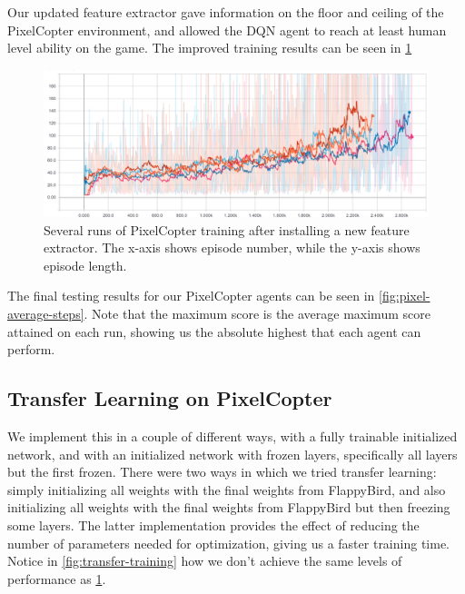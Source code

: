 \documentclass{article}
\begin{document}
Our updated feature extractor gave information on the floor and ceiling of the PixelCopter environment, and allowed the DQN agent to reach at least human level ability on the game. The improved training results can be seen in \ref{fig:pixelcopter-new-features}

\begin{figure}[h!]
\includegraphics[width=\textwidth]{pixelcopter-new-features}
\caption{Several runs of PixelCopter training after installing a new feature extractor. The x-axis shows episode number, while the y-axis shows episode length.}
\label{fig:pixelcopter-new-features}
\end{figure}

The final testing results for our PixelCopter agents can be seen in \ref{fig:pixel-average-steps}.
Note that the maximum score is the average maximum score attained on each run, showing us the absolute highest that each agent can perform. 

\subsection{Transfer Learning on PixelCopter}
We implement this in a couple of different ways, with a fully trainable initialized network, and with an initialized network with frozen layers, specifically all layers but the first frozen.
There were two ways in which we tried transfer learning: simply initializing all weights with the final weights from FlappyBird, and also initializing all weights with the final weights from FlappyBird but then freezing some layers.
The latter implementation provides the effect of reducing the number of parameters needed for optimization, giving us a faster training time.
Notice in \ref{fig:transfer-training} how we don't achieve the same levels of performance as \ref{fig:pixelcopter-new-features}.
\end{document}
